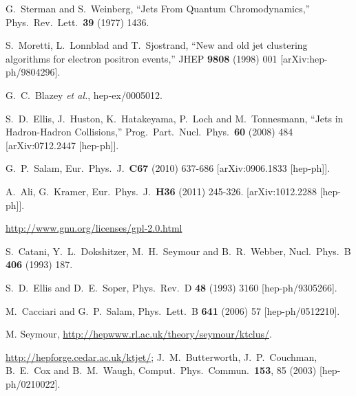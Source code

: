 \documentclass[12pt,a4]{article}
\begin{document}
\begin{thebibliography}{99}

  G.~Sterman and S.~Weinberg,
  ``Jets From Quantum Chromodynamics,''
  Phys.\ Rev.\ Lett.\  {\bf 39} (1977) 1436.

  S.~Moretti, L.~Lonnblad and T.~Sjostrand,
   ``New and old jet clustering algorithms for electron positron events,''
  JHEP {\bf 9808} (1998) 001
  [arXiv:hep-ph/9804296].

  G.~C.~Blazey {\it et al.},
  hep-ex/0005012.

  S.~D.~Ellis, J.~Huston, K.~Hatakeyama, P.~Loch and M.~Tonnesmann,
  ``Jets in Hadron-Hadron Collisions,''
  Prog.\ Part.\ Nucl.\ Phys.\  {\bf 60} (2008) 484
  [arXiv:0712.2447 [hep-ph]].

  G.~P.~Salam,
  Eur.\ Phys.\ J.\  {\bf C67 } (2010)  637-686
  [arXiv:0906.1833 [hep-ph]].


  A.~Ali, G.~Kramer,
  Eur.\ Phys.\ J.\  {\bf H36 } (2011)  245-326.
  [arXiv:1012.2288 [hep-ph]].

  \url{http://www.gnu.org/licenses/gpl-2.0.html}

  S.~Catani, Y.~L.~Dokshitzer, M.~H.~Seymour and B.~R.~Webber,
  Nucl.\ Phys.\ B {\bf 406}  (1993)  187.

  S.~D.~Ellis and D.~E.~Soper,
  Phys.\ Rev.\ D {\bf 48} (1993) 3160 
  [hep-ph/9305266]. 

  M.~Cacciari and G.~P.~Salam,
  Phys.\ Lett.\ B {\bf 641} (2006) 57
  [hep-ph/0512210].

  M. Seymour,
  \url{http://hepwww.rl.ac.uk/theory/seymour/ktclus/}.


  \url{http://hepforge.cedar.ac.uk/ktjet/};
  J.~M.~Butterworth, J.~P.~Couchman, B.~E.~Cox and B.~M.~Waugh,
  Comput.\ Phys.\ Commun.\  {\bf 153}, 85 (2003)
  [hep-ph/0210022].


\end{thebibliography}
\end{document}
